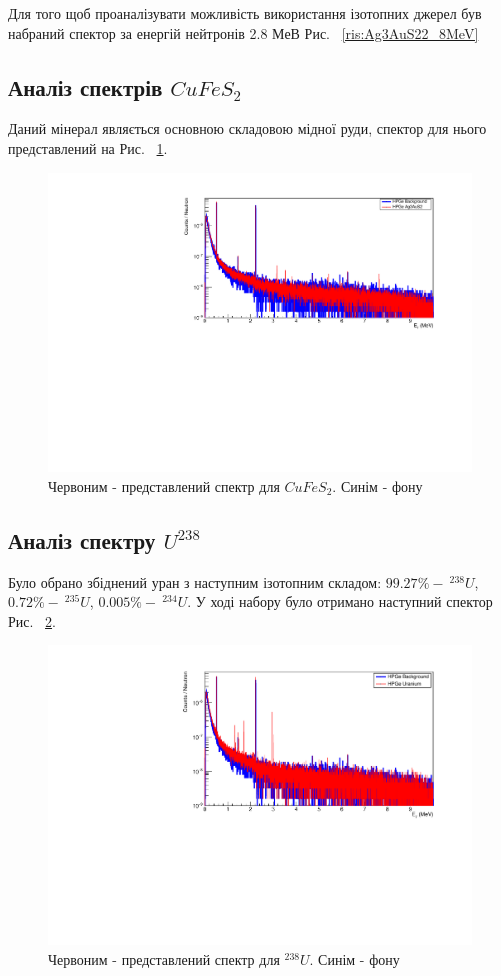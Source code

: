 \documentclass[a4paper, 14pt]{article}
\numberwithin{equation}{section}
\numberwithin{table}{section}
\begin{document}
Для того щоб проаналізувати можливість використання ізотопних джерел був набраний спектор за енергій нейтронів 2.8 МеВ Рис. ~\ref{ris:Ag3AuS22_8MeV}
\newpage
\subsection{Аналіз спектрів $CuFeS_2$}
Даний мінерал являється основною складовою мідної руди, спектор для нього представлений на Рис. ~\ref{ris:CuFeS_2Fon}.
\begin{figure}[hbt!]
	\centering \includegraphics[width=1\textwidth]{res/smCuFeS2FonAll.pdf}
	\caption{Червоним - представлений спектр для $CuFeS_2$. Синім - фону} 
	\label{ris:CuFeS_2Fon}	
\end{figure}

\newpage
\subsection{Аналіз спектру $U^{238}$}
Було обрано збіднений уран з наступним ізотопним складом: $99.27\% -\  ^{238}U$, $ 0.72\% - \  ^{235}U$, $ 0.005\% - \ ^{234}U$. У ході набору було отримано наступний спектор Рис. ~\ref{ris:poorU}.
\begin{figure}[hbt!]
	\centering \includegraphics[width=1\textwidth]{res/poorUranium.pdf}
	\caption{Червоним - представлений спектр для $^{238}U$. Синім - фону} 
	\label{ris:poorU}	
\end{figure} 	
\end{document}
